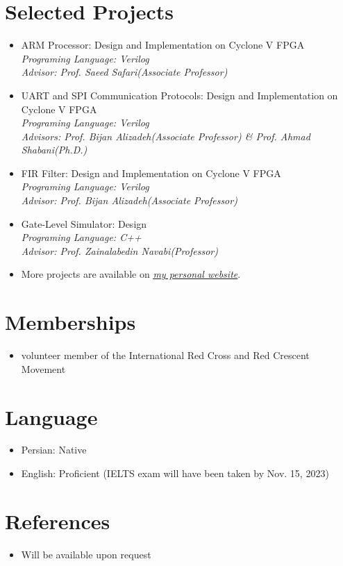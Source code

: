 \documentclass[letterpaper,11pt]{article}
\begin{document}
\section{Selected Projects}
\begin{itemize}
    \item ARM Processor: Design and Implementation on Cyclone V FPGA\\ \textit{Programing Language: Verilog} \\ \textit{Advisor: Prof. Saeed Safari(Associate Professor)}
    \item UART and SPI Communication Protocols: Design and Implementation on Cyclone V FPGA \\ \textit{Programing Language: Verilog} \\ \textit{Advisors: Prof. Bijan Alizadeh(Associate Professor) \& Prof. Ahmad Shabani(Ph.D.)}
    \item FIR Filter: Design and Implementation on Cyclone V FPGA \\ \textit{Programing Language: Verilog} \\ \textit{Advisor: Prof. Bijan Alizadeh(Associate Professor)}
    \item Gate-Level Simulator: Design \\ \textit{Programing Language: C++}  \\ \textit{Advisor: Prof. Zainalabedin Navabi(Professor)}
    \item More projects are available on  \href{https://ali-imangholi.github.io}{\textit{\underline{my personal website}}}. 
\end{itemize}

\section{Memberships}
\begin{itemize}
\item volunteer member of the International Red Cross and Red Crescent Movement
\end{itemize}

\section{Language}
\begin{itemize}
\item Persian: Native
\item English: Proficient (IELTS exam will have been taken by Nov. 15, 2023)
\end{itemize}

\section{References}
\begin{itemize}
\item Will be available upon request
\end{itemize}
\end{document}
